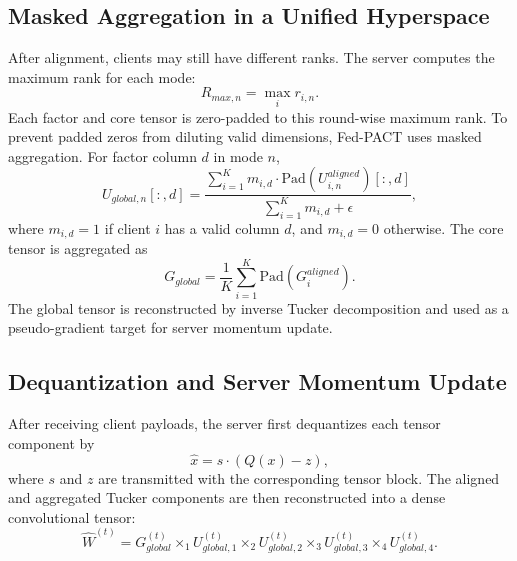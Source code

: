 \documentclass[conference]{IEEEtran}
\begin{document}
\subsection{Masked Aggregation in a Unified Hyperspace}
After alignment, clients may still have different ranks. The server computes the maximum rank for each mode:
\begin{equation}
    R_{max,n}=\max_i r_{i,n}.
\end{equation}
Each factor and core tensor is zero-padded to this round-wise maximum rank. To prevent padded zeros from diluting valid dimensions, Fed-PACT uses masked aggregation. For factor column $d$ in mode $n$,
\begin{equation}
    U_{global,n}[:,d]=\frac{\sum_{i=1}^{K} m_{i,d} \cdot \mathrm{Pad}(U_{i,n}^{aligned})[:,d]}{\sum_{i=1}^{K}m_{i,d}+\epsilon},
    \label{eq:maskfactor}
\end{equation}
where $m_{i,d}=1$ if client $i$ has a valid column $d$, and $m_{i,d}=0$ otherwise. The core tensor is aggregated as
\begin{equation}
    G_{global}=\frac{1}{K}\sum_{i=1}^{K}\mathrm{Pad}(G_i^{aligned}).
    \label{eq:coreagg}
\end{equation}
The global tensor is reconstructed by inverse Tucker decomposition and used as a pseudo-gradient target for server momentum update.
\subsection{Dequantization and Server Momentum Update}

After receiving client payloads, the server first dequantizes each tensor component by
\begin{equation}
    \hat{x}=s\cdot(Q(x)-z),
\end{equation}
where $s$ and $z$ are transmitted with the corresponding tensor block. The aligned and aggregated Tucker components are then reconstructed into a dense convolutional tensor:
\begin{equation}
    \hat{W}^{(t)}=G_{global}^{(t)}
    \times_1 U_{global,1}^{(t)}
    \times_2 U_{global,2}^{(t)}
    \times_3 U_{global,3}^{(t)}
    \times_4 U_{global,4}^{(t)}.
\end{equation}
\end{document}
